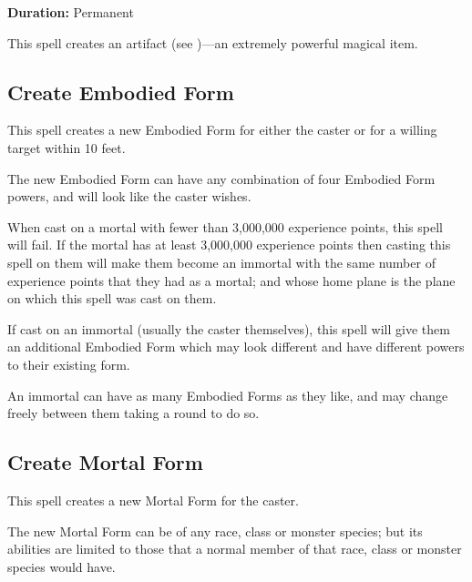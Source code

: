 \begin{multicols*}{2}
{\textbf{Duration:} Permanent}

This spell creates an artifact (see )—an extremely powerful magical item.

\subsection{Create Embodied Form}

This spell creates a new Embodied Form for either the caster or for a willing target within 10 feet.

The new Embodied Form can have any combination of four Embodied Form powers, and will look like the caster wishes.

When cast on a mortal with fewer than 3,000,000 experience points, this spell will fail. If the mortal has at least 3,000,000 experience points then casting this spell on them will make them become an immortal with the same number of experience points that they had as a mortal; and whose home plane is the plane on which this spell was cast on them.

If cast on an immortal (usually the caster themselves), this spell will give them an additional Embodied Form which may look different and have different powers to their existing form.

An immortal can have as many Embodied Forms as they like, and may change freely between them taking a round to do so.

\subsection{Create Mortal Form}

This spell creates a new Mortal Form for the caster.

The new Mortal Form can be of any race, class or monster species; but its abilities are limited to those that a normal member of that race, class or monster species would have.


\end{multicols*}
